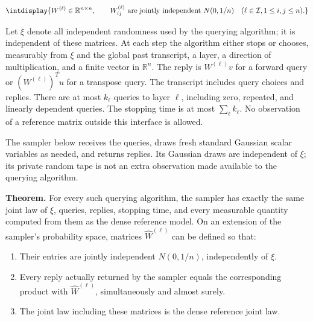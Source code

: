 \begingroup\renewcommand{\theHequation}{intdisplay.1047}
\begin{equation*}
\intdisplay{
W^{(\ell)}\in\mathbb R^{n\times n},\qquad
 W^{(\ell)}_{ij}\ \text{are jointly independent }N(0,1/n)
 \quad(\ell\in\mathcal I, 1\leq i,j\leq n).
}
\end{equation*}
\endgroup


Let \(\xi\) denote all independent randomness used by the querying algorithm; it is independent of these matrices. At each step the algorithm either stops or chooses, measurably from \(\xi\) and the global past transcript, a layer, a direction of multiplication, and a finite vector in \(\mathbb R^n\). The reply is \(W^{(\ell)}v\) for a forward query or \((W^{(\ell)})^T u\) for a transpose query. The transcript includes query choices and replies. There are at most \(k_\ell\) queries to layer \(\ell\), including zero, repeated, and linearly dependent queries. The stopping time is at most \(\sum_\ell k_\ell\). No observation of a reference matrix outside this interface is allowed.



The sampler below receives the queries, draws fresh standard Gaussian scalar variables as needed, and returns replies. Its Gaussian draws are independent of \(\xi\); its private random tape is not an extra observation made available to the querying algorithm.



\textbf{Theorem.} For every such querying algorithm, the sampler has exactly the same joint law of \(\xi\), queries, replies, stopping time, and every measurable quantity computed from them as the dense reference model. On an extension of the sampler's probability space, matrices \(\widehat W^{(\ell)}\) can be defined so that:


\begin{enumerate}
\item[1.] Their entries are jointly independent \(N(0,\allowbreak 1/n)\), independently of \(\xi\).
\item[2.] Every reply actually returned by the sampler equals the corresponding product with \(\widehat W^{(\ell)}\), simultaneously and almost surely.
\item[3.] The joint law including these matrices is the dense reference joint law.
\end{enumerate}

